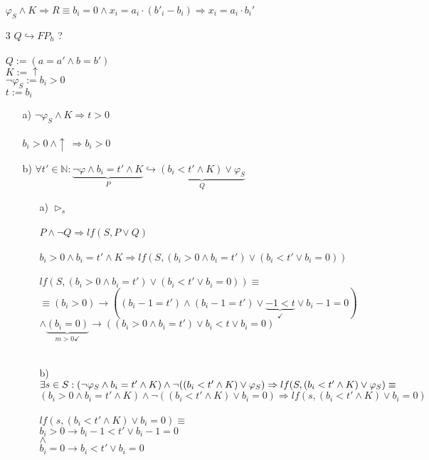 \documentclass{article}
\begin{document}
\begin{enumerate}
$\varphi_S \land K \Rightarrow R \equiv b_i = 0 \land x_i = a_i \cdot (b'_i - b_i) \Rightarrow x_i = a_i \cdot b_i'$ \checkmark
\item[3]
$Q \hookrightarrow FP_h$ ? \\\\
$Q := (a=a' \land b=b')$\\
$K := \uparrow$\\
$\neg \varphi_S := b_i > 0$\\
$t := b_i$\\
\begin{enumerate}
\item[a)]
$\neg \varphi_S \land K \Rightarrow t > 0$\\\\
$b_i > 0\ \land \uparrow\ \Rightarrow b_i > 0$ \checkmark \\
\item[b)]
$\forall t' \in \mathbb{N} : \underbrace{\neg \varphi \land b_i = t' \land K}_P \hookrightarrow \underbrace{(b_i < t' \land K) \lor \varphi_S}_Q$
\begin{enumerate}
\item[a)]
$\triangleright_s$ \checkmark \\\\
$P \land \neg Q \Rightarrow lf(S, P \lor Q)$\\\\
$b_i > 0 \land b_i = t' \land K \Rightarrow lf(S, (b_i>0 \land b_i=t') \lor (b_i < t' \lor b_i=0))$\\\\
$lf(S, (b_i>0 \land b_i=t') \lor (b_i < t' \lor b_i =0)) \equiv$\\
$\equiv (b_i>0) \rightarrow ((b_i-1 = t') \land (b_i-1=t') \lor \underbrace{-1<t}_{\checkmark} \lor b_i-1 = 0)$\\
$\land \underbrace{(b_i =0)}_{m>0 \checkmark} \rightarrow ((b_i > 0 \land b_i = t') \lor b_i<t \lor b_i = 0)$
\\\\
\item[b)]
$\exists s \in S : ( \neg \varphi_S \land b_i = t' \land K) \land \lnot ((b_i < t' \land K) \lor \varphi_S) \Rightarrow \\ lf(S, (b_i < t' \land K) \lor \varphi_S)\equiv$
$( b_i > 0 \land b_i = t' \land K) \land \lnot ((b_i < t' \land K) \lor b_i=0) \Rightarrow lf(s, (b_i < t' \land K) \lor b_i=0)$\\\\
$lf(s, (b_i < t' \land K) \lor b_i=0)\equiv$\\
$b_i>0 \rightarrow b_i-1 <t' \lor b_i-1 = 0$ \checkmark \\
$\land$\\
$b_i=0 \rightarrow b_i <t' \lor b_i = 0$ \checkmark \\
\end{enumerate}
\end{enumerate}
\end{enumerate}
\end{document}
